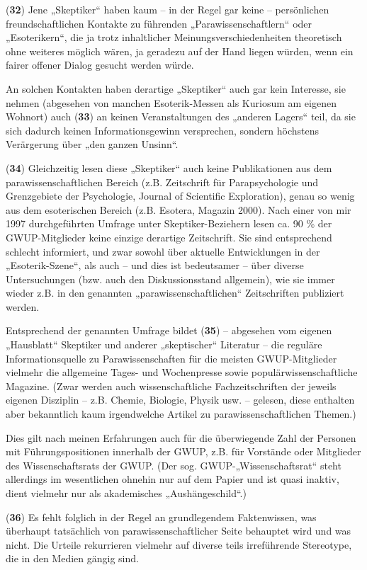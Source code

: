 (\textbf{32}) Jene „Skeptiker`` haben kaum -- in der Regel gar keine --
persönlichen freundschaftlichen Kontakte zu führenden
„Parawissenschaftlern`` oder „Esoterikern``, die ja trotz inhaltlicher
Meinungsverschiedenheiten theoretisch ohne weiteres möglich wären, ja
geradezu auf der Hand liegen würden, wenn ein fairer offener Dialog
gesucht werden würde.

An solchen Kontakten haben derartige „Skeptiker`` auch gar kein
Interesse, sie nehmen (abgesehen von manchen Esoterik-Messen als
Kuriosum am eigenen Wohnort) auch (\textbf{33}) an keinen
Veranstaltungen des „anderen Lagers`` teil, da sie sich dadurch keinen
Informationsgewinn versprechen, sondern höchstens Verärgerung über „den
ganzen Unsinn``.

(\textbf{34}) Gleichzeitig lesen diese „Skeptiker`` auch keine
Publikationen aus dem parawissenschaftlichen Bereich (z.B. Zeitschrift
für Parapsychologie und Grenzgebiete der Psychologie, Journal of
Scientific Exploration), genau so wenig aus dem esoterischen Bereich
(z.B. Esotera, Magazin 2000). Nach einer von mir 1997 durchgeführten
Umfrage unter Skeptiker-Beziehern lesen ca. 90 \% der GWUP-Mitglieder
keine einzige derartige Zeitschrift. Sie sind entsprechend schlecht
informiert, und zwar sowohl über aktuelle Entwicklungen in der
„Esoterik-Szene``, als auch -- und dies ist bedeutsamer -- über diverse
Untersuchungen (bzw. auch den Diskussionsstand allgemein), wie sie immer
wieder z.B. in den genannten „parawissenschaftlichen`` Zeitschriften
publiziert werden.

Entsprechend der genannten Umfrage bildet (\textbf{35}) -- abgesehen vom
eigenen „Hausblatt`` Skeptiker und anderer „skeptischer`` Literatur --
die reguläre Informationsquelle zu Parawissenschaften für die meisten
GWUP-Mitglieder vielmehr die allgemeine Tages- und Wochenpresse sowie
populärwissenschaftliche Magazine. (Zwar werden auch wissenschaftliche
Fachzeitschriften der jeweils eigenen Disziplin -- z.B. Chemie,
Biologie, Physik usw. -- gelesen, diese enthalten aber bekanntlich kaum
irgendwelche Artikel zu parawissenschaftlichen Themen.)

Dies gilt nach meinen Erfahrungen auch für die überwiegende Zahl der
Personen mit Führungspositionen innerhalb der GWUP, z.B. für Vorstände
oder Mitglieder des Wissenschaftsrats der GWUP. (Der sog.
GWUP-„Wissenschaftsrat`` steht allerdings im wesentlichen ohnehin nur
auf dem Papier und ist quasi inaktiv, dient vielmehr nur als
akademisches „Aushängeschild``.)

(\textbf{36}) Es fehlt folglich in der Regel an grundlegendem
Faktenwissen, was überhaupt tatsächlich von parawissenschaftlicher Seite
behauptet wird und was nicht. Die Urteile rekurrieren vielmehr auf
diverse teils irreführende Stereotype, die in den Medien gängig sind.

